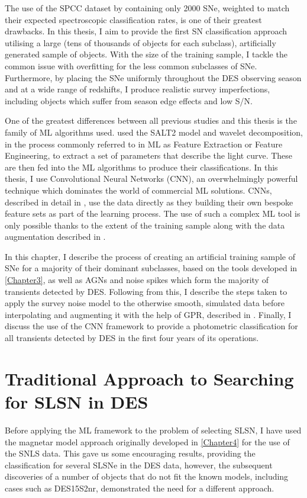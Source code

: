 The use of the SPCC dataset by \citet{Lochner2016} containing only 2000 SNe, weighted to match their expected spectroscopic classification rates, is one of their greatest drawbacks. In this thesis, I aim to provide the first SN classification approach utilising a large (tens of thousands of objects for each subclass), artificially generated sample of objects. With the size of the training sample, I tackle the common issue with overfitting for the less common subclasses of SNe. Furthermore, by placing the SNe uniformly throughout the DES observing season and at a wide range of redshifts, I produce realistic survey imperfections, including objects which suffer from season edge effects and low S/N.

One of the greatest differences between all previous studies and this thesis is the family of ML algorithms used. \citet{Lochner2016} used the SALT2 model and wavelet decomposition, in the process commonly referred to in ML as Feature Extraction or Feature Engineering, to extract a set of parameters that describe the light curve. These are then fed into the ML algorithms to produce their classifications. In this thesis, I use Convolutional Neural Networks (CNN), an overwhelmingly powerful technique which dominates the world of commercial ML solutions. CNNs, described in detail in , use the data directly as they building their own bespoke feature sets as part of the learning process. The use of such a complex ML tool is only possible thanks to the extent of the training sample along with the data augmentation described in .

In this chapter, I describe the process of creating an artificial training sample of SNe for a majority of their dominant subclasses, based on the tools developed in \cref{Chapter3}, as well as AGNs and noise spikes which form the majority of transients detected by DES. Following from this, I describe the steps taken to apply the survey noise model to the otherwise smooth, simulated data before interpolating and augmenting it with the help of GPR, described in . Finally, I discuss the use of the CNN framework to provide a photometric classification for all transients detected by DES in the first four years of its operations.

\section{Traditional Approach to Searching for SLSN in DES}
Before applying the ML framework to the problem of selecting SLSN, I have used the magnetar model approach originally developed in \cref{Chapter4} for the use of the SNLS data. This gave us some encouraging results, providing the classification for several SLSNe in the DES data, however, the subsequent discoveries of a number of objects that do not fit the known models, including cases such as DES15S2nr, demonstrated the need for a different approach.

